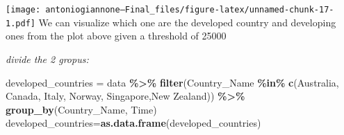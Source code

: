 \documentclass[
]{article}
\newenvironment{Shaded}{\begin{snugshade}}{\end{snugshade}}
\newcommand{\AttributeTok}[1]{\textcolor[rgb]{0.13,0.29,0.53}{#1}}
\newcommand{\DecValTok}[1]{\textcolor[rgb]{0.00,0.00,0.81}{#1}}
\newcommand{\FunctionTok}[1]{\textcolor[rgb]{0.13,0.29,0.53}{\textbf{#1}}}
\newcommand{\NormalTok}[1]{#1}
\newcommand{\OtherTok}[1]{\textcolor[rgb]{0.56,0.35,0.01}{#1}}
\newcommand{\SpecialCharTok}[1]{\textcolor[rgb]{0.81,0.36,0.00}{\textbf{#1}}}
\newcommand{\StringTok}[1]{\textcolor[rgb]{0.31,0.60,0.02}{#1}}
\begin{document}
\begin{Shaded}
\end{Shaded}

\texttt{[image: antoniogiannone---Final\_files/figure-latex/unnamed-chunk-17-1.pdf]}
We can visualize which one are the developed country and developing ones
from the plot above given a threshold of 25000

\emph{divide the 2 gropus:}

\begin{Shaded}
\begin{Highlighting}[]
\NormalTok{developed\_countries }\OtherTok{=}\NormalTok{ data }\SpecialCharTok{\%\textgreater{}\%}
  \FunctionTok{filter}\NormalTok{(Country\_Name }\SpecialCharTok{\%in\%} \FunctionTok{c}\NormalTok{(}\StringTok{\textquotesingle{}Australia\textquotesingle{}}\NormalTok{, }\StringTok{\textquotesingle{}Canada\textquotesingle{}}\NormalTok{, }\StringTok{\textquotesingle{}Italy\textquotesingle{}}\NormalTok{, }\StringTok{\textquotesingle{}Norway\textquotesingle{}}\NormalTok{, }\StringTok{\textquotesingle{}Singapore\textquotesingle{}}\NormalTok{,}\StringTok{\textquotesingle{}New Zealand\textquotesingle{}}\NormalTok{)) }\SpecialCharTok{\%\textgreater{}\%}
  \FunctionTok{group\_by}\NormalTok{(Country\_Name, Time)}
\NormalTok{developed\_countries}\OtherTok{=}\FunctionTok{as.data.frame}\NormalTok{(developed\_countries)}
\end{Highlighting}
\end{Shaded}
\end{document}
